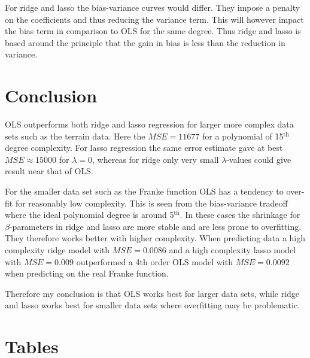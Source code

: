 \documentclass[uio,jmp,amsmath,amssymb,reprint,nofootinbib]{revtex4-1}
\numberwithin{equation}{section}
\begin{document}
For ridge and lasso the bias-variance curves would differ. They impose a penalty on the coefficients and thus reducing the variance term. This will however impact the bias term in comparison to OLS for the same degree. Thus ridge and lasso is based around the principle that the gain in bias is less than the reduction in variance.

\section{Conclusion}\label{sec:Conclusion}

OLS outperforms both ridge and lasso regression for larger more complex data sets such as the terrain data. Here the \(MSE=11677\) for a polynomial of 15\(^\text{th}\) degree complexity. For lasso regression the same error estimate gave at best \(MSE\approx 15000\) for \(\lambda = 0\), whereas for ridge only very small \(\lambda\)-values could give result near that of OLS.

For the smaller data set such as the Franke function OLS has a tendency to over-fit for reasonably low complexity. This is seen from the bias-variance tradeoff where the ideal polynomial degree is around 5\(^\text{th}\). In these cases the shrinkage for \(\beta\)-parameters in ridge and lasso are more stable and are less prone to overfitting. They therefore works better with higher complexity. When predicting data a high complexity ridge model with \(MSE = 0.0086\) and a high complexity lasso model with \(MSE = 0.009\) outperformed a 4\(\text{th}\) order OLS model with \(MSE = 0.0092\) when predicting on the real Franke function.

Therefore my conclusion is that OLS works best for larger data sets, while ridge and lasso works best for smaller data sets where overfitting may be problematic.

\onecolumngrid
\newpage
\twocolumngrid
\appendix

\section{Tables}
\end{document}
